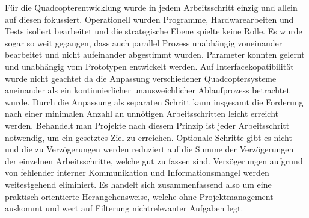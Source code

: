 Für die Quadcopterentwicklung wurde in jedem Arbeitsschritt einzig und allein auf diesen fokussiert. Operationell wurden Programme, Hardwarearbeiten und Tests isoliert bearbeitet und die strategische Ebene spielte keine Rolle. Es wurde sogar so weit gegangen, dass auch parallel Prozess unabhängig voneinander bearbeitet und nicht aufeinander abgestimmt wurden. Parameter konnten gelernt und unabhängig vom Prototypen entwickelt werden. Auf Interfacekopatibilität wurde nicht geachtet da die Anpassung verschiedener Quadcoptersysteme aneinander als ein kontinuierlicher unausweichlicher Ablaufprozess betrachtet wurde. Durch die Anpassung als separaten Schritt kann insgesamt die Forderung nach einer minimalen Anzahl an unnötigen Arbeitsschritten leicht erreicht werden. Behandelt man Projekte nach diesem Prinzip ist jeder Arbeitsschritt notwendig, um ein gesetztes Ziel zu erreichen. Optionale Schritte gibt es nicht und die zu Verzögerungen werden reduziert auf die Summe der Verzögerungen der einzelnen Arbeitsschritte, welche gut zu fassen sind. Verzögerungen aufgrund von fehlender interner Kommunikation und Informationsmangel werden weitestgehend eliminiert. Es handelt sich zusammenfassend also um eine praktisch orientierte Herangehensweise, welche ohne Projektmanagement auskommt und wert auf Filterung nichtrelevanter Aufgaben legt.

